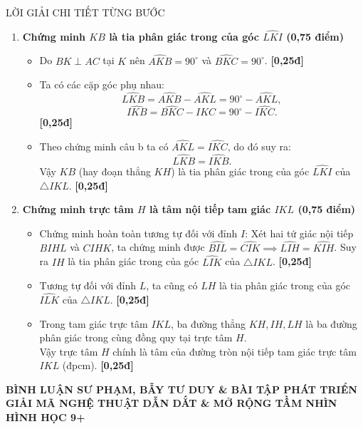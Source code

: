 \documentclass[11pt,a4paper]{article}
\begin{document}
\begin{solutionbox}{LỜI GIẢI CHI TIẾT TỪNG BƯỚC}
\begin{enumerate}[label=\textbf{\arabic*.}, leftmargin=*]
    \vspace{1mm}
    \item \textbf{Chứng minh $KB$ là tia phân giác trong của góc $\widehat{LKI}$ (0,75 điểm)}
    \begin{itemize}[leftmargin=*, nosep]
        \item Do $BK \perp AC$ tại $K$ nên $\widehat{AKB} = 90^\circ$ và $\widehat{BKC} = 90^\circ$. \hfill \textbf{[0,25đ]}
        \item Ta có các cặp góc phụ nhau:
        \[
        \widehat{LKB} = \widehat{AKB} - \widehat{AKL} = 90^\circ - \widehat{AKL},
        \]
        \[
        \widehat{IKB} = \widehat{BKC} - \widehat{IKC} = 90^\circ - \widehat{IKC}.
        \] \hfill \textbf{[0,25đ]}
        \item Theo chứng minh câu b ta có $\widehat{AKL} = \widehat{IKC}$, do đó suy ra:
        \[
        \widehat{LKB} = \widehat{IKB}.
        \]
        Vậy $KB$ (hay đoạn thẳng $KH$) là tia phân giác trong của góc $\widehat{LKI}$ của $\triangle IKL$. \hfill \textbf{[0,25đ]}
    \end{itemize}

    \vspace{1mm}
    \item \textbf{Chứng minh trực tâm $H$ là tâm nội tiếp tam giác $IKL$ (0,75 điểm)}
    \begin{itemize}[leftmargin=*, nosep]
        \item Chứng minh hoàn toàn tương tự đối với đỉnh $I$: Xét hai tứ giác nội tiếp $BIHL$ và $CIHK$, ta chứng minh được $\widehat{BI L} = \widehat{CIK} \implies \widehat{LIH} = \widehat{KIH}$.
        Suy ra $IH$ là tia phân giác trong của góc $\widehat{LI K}$ của $\triangle IKL$. \hfill \textbf{[0,25đ]}
        \item Tương tự đối với đỉnh $L$, ta cũng có $LH$ là tia phân giác trong của góc $\widehat{ILK}$ của $\triangle IKL$. \hfill \textbf{[0,25đ]}
        \item Trong tam giác trực tâm $IKL$, ba đường thẳng $KH, IH, LH$ là ba đường phân giác trong cùng đồng quy tại trực tâm $H$.\\
        Vậy trực tâm $H$ chính là tâm của đường tròn nội tiếp tam giác trực tâm $IKL$ (đpcm). \hfill \textbf{[0,25đ]}
    \end{itemize}
\end{enumerate}
\end{solutionbox}

\newpage

\begin{center}
    {\Large\bfseries\color{blue!80!black} BÌNH LUẬN SƯ PHẠM, BẪY TƯ DUY \& BÀI TẬP PHÁT TRIỂN}\\[1.5mm]
    {\large\bfseries GIẢI MÃ NGHỆ THUẬT DẪN DẮT \& MỞ RỘNG TẦM NHÌN HÌNH HỌC 9+}
\end{center}
\end{document}
